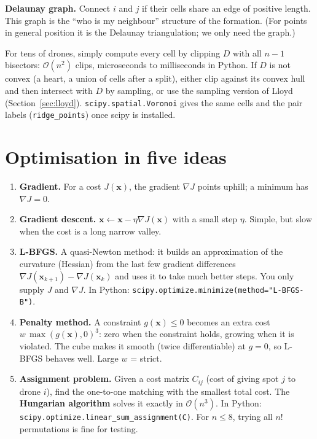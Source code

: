 \documentclass[11pt,a4paper]{article}
\newcommand{\vect}[1]{\mathbf{#1}}
\begin{document}
\textbf{Delaunay graph.} Connect $i$ and $j$ if their cells share an edge of positive length. This graph is the
``who is my neighbour'' structure of the formation. (For points in general position it is the Delaunay
triangulation; we only need the graph.)

\begin{oursbox}
For tens of drones, simply compute every cell by clipping $D$ with all $n-1$ bisectors: $\mathcal{O}(n^2)$ clips,
microseconds to milliseconds in Python. If $D$ is not convex (a heart, a union of cells after a split), either
clip against its convex hull and then intersect with $D$ by sampling, or use the sampling version of Lloyd
(Section~\ref{sec:lloyd}). \texttt{scipy.spatial.Voronoi} gives the same cells and the pair labels
(\texttt{ridge\_points}) once scipy is installed.
\end{oursbox}

\section{Optimisation in five ideas}\label{sec:opt}

\begin{enumerate}
\item \textbf{Gradient.} For a cost $J(\vect{x})$, the gradient $\nabla J$ points uphill; a minimum has $\nabla J=0$.
\item \textbf{Gradient descent.} $\vect{x}\leftarrow\vect{x}-\eta\nabla J(\vect{x})$ with a small step $\eta$.
Simple, but slow when the cost is a long narrow valley.
\item \textbf{L-BFGS.} A quasi-Newton method: it builds an approximation of the curvature (Hessian) from the last few
gradient differences $\nabla J(\vect{x}_{k+1})-\nabla J(\vect{x}_k)$ and uses it to take much better steps. You only
supply $J$ and $\nabla J$. In Python: \texttt{scipy.optimize.minimize(method="L-BFGS-B")}.
\item \textbf{Penalty method.} A constraint $g(\vect{x})\le0$ becomes an extra cost $w\,\max(g(\vect{x}),0)^3$: zero
when the constraint holds, growing when it is violated. The cube makes it smooth (twice differentiable) at $g=0$, so
L-BFGS behaves well. Large $w$ = strict.
\item \textbf{Assignment problem.} Given a cost matrix $C_{ij}$ (cost of giving spot $j$ to drone $i$), find the
one-to-one matching with the smallest total cost. The \textbf{Hungarian algorithm} solves it exactly in
$\mathcal{O}(n^3)$. In Python: \texttt{scipy.optimize.linear\_sum\_assignment(C)}. For $n\le8$, trying all $n!$
permutations is fine for testing.
\end{enumerate}
\end{document}
